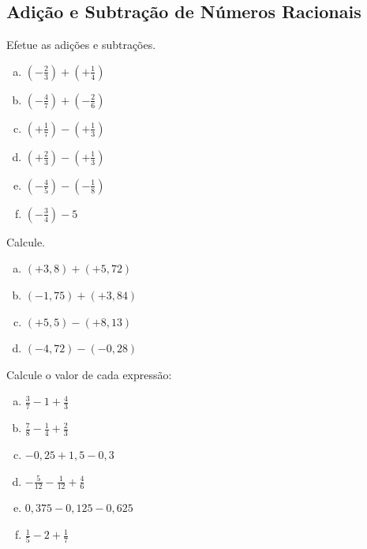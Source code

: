 \subsection{Adição e Subtração de Números Racionais}

\item Efetue as adições e subtrações.
\begin{multicols}{3}
\begin{enumerate}[a)]
	\item $\displaystyle\left(-\frac{2}{3}\right)+\left(+\frac{1}{4}\right)$
	\item $\displaystyle\left(-\frac{4}{7}\right)+\left(-\frac{2}{6}\right)$
	\item $\displaystyle\left(+\frac{1}{7}\right)-\left(+\frac{1}{3}\right)$
	\item $\displaystyle\left(+\frac{2}{3}\right)-\left(+\frac{1}{3}\right)$
	\item $\displaystyle\left(-\frac{4}{5}\right)-\left(-\frac{1}{8}\right)$
	\item $\displaystyle\left(-\frac{3}{4}\right)- 5$
\end{enumerate}
\end{multicols}

\item Calcule.
\begin{multicols}{2}
\begin{enumerate}[a)]
	\item $(+3,8)+(+5,72)$
	\item $(-1,75)+(+3,84)$
	\item $(+5,5)-(+8,13)$
	\item $(-4,72)-(-0,28)$
\end{enumerate}
\end{multicols}

\item Calcule o valor de cada expressão:
\begin{multicols}{3}
\begin{enumerate}[a)]
	\item $\displaystyle\frac{3}{7}-1+\frac{4}{3}$
	\item $\displaystyle\frac{7}{8}-\frac{1}{4}+\frac{2}{3}$
	\item $-0,25+1,5-0,3$
	\item $-\displaystyle\frac{5}{12}-\frac{1}{12}+\frac{4}{6}$
	\item $0,375-0,125 - 0,625$
	\item $\displaystyle\frac{1}{5}-2+\frac{1}{7}$
\end{enumerate}
\end{multicols}


